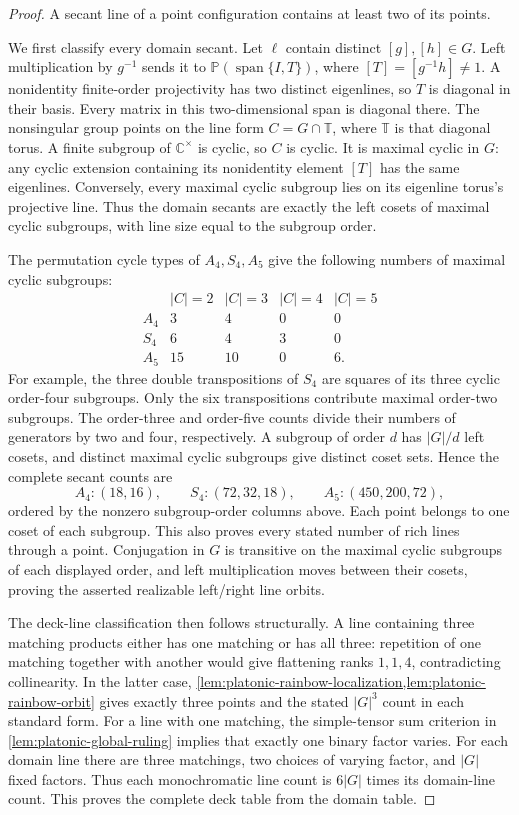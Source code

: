 \documentclass[11pt,letterpaper,onecolumn]{article}
\theoremstyle{plain}
\theoremstyle{definition}
\theoremstyle{remark}
\begin{document}
\begin{proof}
A secant line of a point configuration contains at least two of its points.

We first classify every domain secant.  Let \(\ell\) contain distinct
\([g],[h]\in G\).  Left multiplication by \(g^{-1}\) sends it to
\(\mathbb P(\operatorname{span}\{I,T\})\), where \([T]=[g^{-1}h]\ne1\).
A nonidentity finite-order projectivity has two distinct eigenlines, so
\(T\) is diagonal in their basis.  Every matrix in this two-dimensional
span is diagonal there.  The nonsingular group points on the line form
\(C=G\cap\mathbb T\), where \(\mathbb T\) is that diagonal torus.
A finite subgroup of \(\mathbb C^\times\) is cyclic, so \(C\) is cyclic.
It is maximal cyclic in \(G\): any cyclic extension containing its
nonidentity element \([T]\) has the same eigenlines.  Conversely, every
maximal cyclic subgroup lies on its eigenline torus's projective line.
Thus the domain secants are exactly the left cosets of maximal cyclic
subgroups, with line size equal to the subgroup order.

The permutation cycle types of \(A_4,S_4,A_5\) give the following
numbers of maximal cyclic subgroups:
\[
\begin{array}{c|rrrr}
 &|C|=2&|C|=3&|C|=4&|C|=5\\\hline
 A_4&3&4&0&0\\
 S_4&6&4&3&0\\
 A_5&15&10&0&6.
\end{array}
\]
For example, the three double transpositions of \(S_4\) are squares of
its three cyclic order-four subgroups. Only the six transpositions
contribute maximal order-two subgroups.  The order-three and order-five
counts divide their numbers of generators by two and four, respectively.
A subgroup of order \(d\) has \(|G|/d\) left cosets, and distinct maximal
cyclic subgroups give distinct coset sets.  Hence the complete secant
counts are
\[
 A_4:(18,16),\qquad S_4:(72,32,18),\qquad A_5:(450,200,72),
\]
ordered by the nonzero subgroup-order columns above.  Each point belongs
to one coset of each subgroup.  This also proves every stated number of
rich lines through a point.  Conjugation in \(G\) is transitive on the maximal cyclic subgroups of each
displayed order, and left multiplication moves
between their cosets, proving the asserted realizable left/right line orbits.

The deck-line classification then follows structurally.  A line containing
three matching products either has one matching or has all three:
repetition of one matching together with another would give flattening
ranks \(1,1,4\), contradicting collinearity.  In the latter case,
\cref{lem:platonic-rainbow-localization,lem:platonic-rainbow-orbit} gives
exactly three points and the stated \(|G|^3\) count in each standard
form.  For a line with one matching, the simple-tensor sum criterion in
\cref{lem:platonic-global-ruling} implies that exactly one binary factor
varies.  For each domain line there are three matchings, two choices of
varying factor, and \(|G|\) fixed factors.  Thus each monochromatic
line count is \(6|G|\) times its domain-line count.  This proves the
complete deck table from the domain table.


\end{proof}
\end{document}
